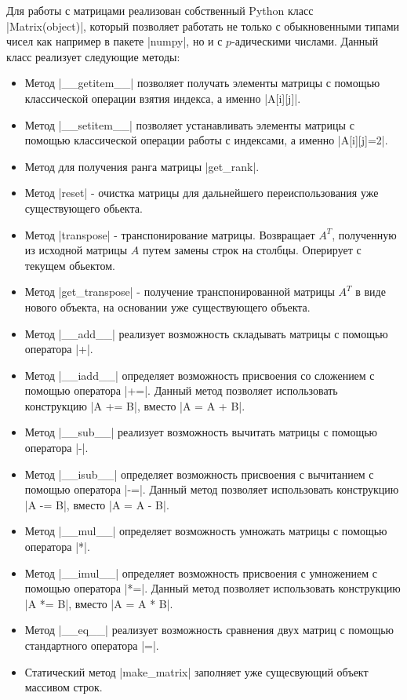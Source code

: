 \documentclass[master, och, diploma, times]{sty/SCWorks}
\theoremstyle{plain}
\theoremstyle{definition}
\begin{document}
Для работы с матрицами реализован собственный Python класс \\ |Matrix(object)|, который позволяет работать не только с обыкновенными типами чисел как например в пакете |numpy|, но и с $p$-адическими числами. Данный класс реализует следующие методы:
\begin{itemize}
\item Метод |__getitem__| позволяет получать элементы матрицы с помощью классической операции взятия индекса, а именно |A[i][j]|.
\item Метод |__setitem__| позволяет устанавливать элементы матрицы с помощью классической операции работы с индексами, а именно |A[i][j]=2|.
\item Метод для получения ранга матрицы |get_rank|.
\item Метод |reset| - очистка матрицы для дальнейшего переиспользования уже существующего обьекта.
\item Метод |transpose| - транспонирование матрицы. Возвращает $A^{T}$, полученную из исходной матрицы $A$ путем замены строк на столбцы. Оперирует с текущем обьектом.
\item Метод |get_transpose| - получение транспонированной матрицы $A^{T}$ в виде нового объекта, на основании уже существующего объекта.
\item Метод |__add__| реализует возможность складывать матрицы с помощью оператора |+|.
\item Метод |__iadd__| определяет возможность присвоения со сложением с помощью оператора |+=|. Данный метод позволяет использовать конструкцию |A += B|, вместо |A = A + B|.
\item Метод |__sub__| реализует возможность вычитать матрицы с помощью оператора |-|.
\item Метод |__isub__| определяет возможность присвоения с вычитанием с помощью оператора |-=|. Данный метод позволяет использовать конструкцию |A -= B|, вместо |A = A - B|.
\item Метод |__mul__| определяет возможность умножать матрицы с помощью оператора |*|.
\item Метод |__imul__| определяет возможность присвоения с умножением с помощью оператора |*=|. Данный метод позволяет использовать конструкцию |A *= B|, вместо |A = A * B|.
\item Метод |__eq__| реализует возможность сравнения двух матриц с помощью стандартного оператора |=|.
\item Статический метод |make_matrix| заполняет уже сущесвующий объект массивом строк.

\end{itemize}
\end{document}
